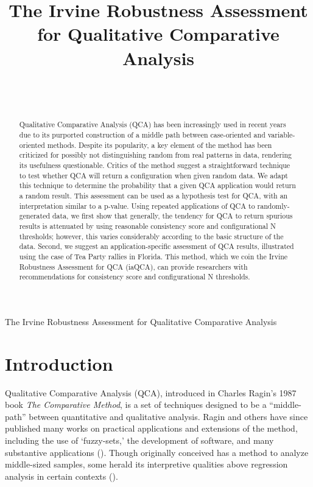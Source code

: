 \documentclass[]{article}
\title{{The Irvine Robustness Assessment for Qualitative Comparative Analysis}}
\author{
{}\\
{}\\
}
\begin{document}
\maketitle
\doublespace
\newpage


\newpage

{{
{\LARGE{\begin{center}\begin{singlespace}The Irvine Robustness Assessment for Qualitative Comparative Analysis\end{singlespace}\end{center}}}}


\begin{abstract}
Qualitative Comparative Analysis (QCA) has been increasingly used in recent years due to its purported construction of a middle path between case-oriented and variable-oriented methods. Despite its popularity, a key element of the method has been criticized for possibly not distinguishing random from real patterns in data, rendering its usefulness questionable. Critics of the method suggest a straightforward technique to test whether QCA will return a configuration when given random data. We adapt this technique to determine the probability that a given QCA application would return a random result. This assessment can be used as a hypothesis test for QCA, with an interpretation similar to a p-value. Using repeated applications of QCA to randomly-generated data, we first show that generally, the tendency for QCA to return spurious results is attenuated by using reasonable consistency score and configurational N thresholds; however, this varies considerably according to the basic structure of the data. Second, we suggest an application-specific assessment of QCA results, illustrated using the case of Tea Party rallies in Florida. This method, which we coin the Irvine Robustness Assessment for QCA (iaQCA), can provide researchers with recommendations for consistency score and configurational N thresholds.
\end{abstract}
\newpage

\section{Introduction}


Qualitative Comparative Analysis (QCA), introduced in Charles Ragin's 1987 book {\it{The Comparative Method}}, is a set of techniques designed to be a ``middle-path'' between quantitative and qualitative analysis. Ragin and others have since published many works on practical applications and extensions of the method, including the use of `fuzzy-sets,' the development of software, and many substantive applications (\citealt{dusa_and_thiem_2014,caramani_2008,ragin_2008,rihoux_and_ragin_2009,schneider_and_wagemann_2007,thiem_and_dusa_2013}). Though originally conceived has a method to analyze middle-sized samples, some herald its interpretive qualities above regression analysis in certain contexts (\citealt{katz_et_al_2005,seawright_2005,vis_2012}).

}
\end{document}
